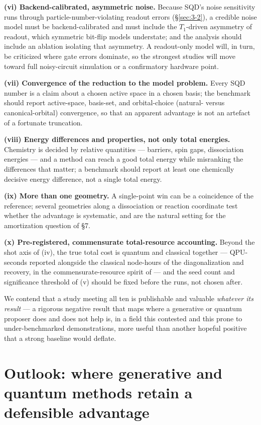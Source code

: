 \documentclass[11pt]{article}
\begin{document}
\textbf{(vi) Backend-calibrated, asymmetric noise.} Because SQD's noise sensitivity runs through particle-number-violating readout errors (\S\ref{sec:3-2}), a credible noise model must be backend-calibrated and must include the $T_1$-driven asymmetry of readout, which symmetric bit-flip models understate; and the analysis should include an ablation isolating that asymmetry. A readout-only model will, in turn, be criticized where gate errors dominate, so the strongest studies will move toward full noisy-circuit simulation or a confirmatory hardware point.

\textbf{(vii) Convergence of the reduction to the model problem.} Every SQD number is a claim about a chosen active space in a chosen basis; the benchmark should report active-space, basis-set, and orbital-choice (natural- versus canonical-orbital) convergence, so that an apparent advantage is not an artefact of a fortunate truncation.

\textbf{(viii) Energy differences and properties, not only total energies.} Chemistry is decided by relative quantities --- barriers, spin gaps, dissociation energies --- and a method can reach a good total energy while misranking the differences that matter; a benchmark should report at least one chemically decisive energy difference, not a single total energy.

\textbf{(ix) More than one geometry.} A single-point win can be a coincidence of the reference; several geometries along a dissociation or reaction coordinate test whether the advantage is systematic, and are the natural setting for the amortization question of \S7.

\textbf{(x) Pre-registered, commensurate total-resource accounting.} Beyond the shot axis of (iv), the true total cost is quantum and classical together --- QPU-seconds reported alongside the classical node-hours of the diagonalization and recovery, in the commensurate-resource spirit of \cite{raisuddin2025} --- and the seed count and significance threshold of (v) should be fixed before the runs, not chosen after.

We contend that a study meeting all ten is publishable and valuable \emph{whatever its result} --- a rigorous negative result that maps where a generative or quantum proposer does and does not help is, in a field this contested and this prone to under-benchmarked demonstrations, more useful than another hopeful positive that a strong baseline would deflate.


\section{Outlook: where generative and quantum methods retain a defensible advantage}\label{sec:7}
\end{document}
